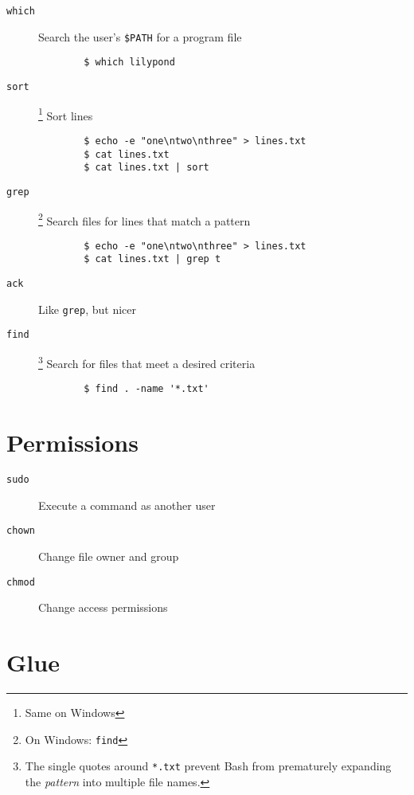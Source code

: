 \documentclass[a4paper]{tufte-handout}
\begin{document}
\begin{description}
    \item [\texttt{which}]
        \hfill Search the user's \texttt{\$PATH} for a program file
        \begin{verbatim}
        $ which lilypond
        \end{verbatim}
    \item [\texttt{sort}]
        \footnote{Same on Windows}
        \hfill Sort lines
        \begin{verbatim}
        $ echo -e "one\ntwo\nthree" > lines.txt
        $ cat lines.txt
        $ cat lines.txt | sort
        \end{verbatim}
    \item [\texttt{grep}]
        \footnote{On Windows: \texttt{find}}
        \hfill Search files for lines that match a pattern
        \begin{verbatim}
        $ echo -e "one\ntwo\nthree" > lines.txt
        $ cat lines.txt | grep t
        \end{verbatim}
    \item [\texttt{ack}]
        \hfill Like \texttt{grep}, but nicer
    \item [\texttt{find}]
        \footnote{The single quotes around \texttt{*{}.txt} prevent Bash from
        prematurely expanding the \emph{pattern} into multiple file names.}
        \hfill Search for files that meet a desired criteria
        \begin{verbatim}
        $ find . -name '*.txt'
        \end{verbatim}
\end{description}

\hrulefill{}

\section{Permissions}

\begin{description}
    \item [\texttt{sudo}]
        \hfill Execute a command as another user
    \item [\texttt{chown}]
        \hfill Change file owner and group
    \item [\texttt{chmod}]
        \hfill Change access permissions
\end{description}

\hrulefill{}

\section{Glue}
\end{document}
